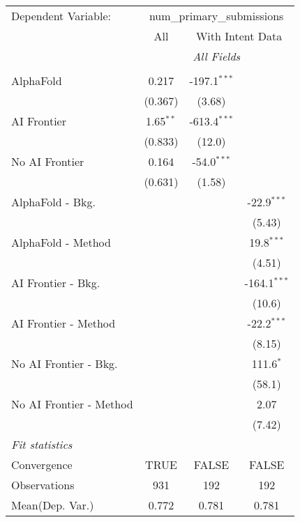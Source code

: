 \begingroup
\centering
\begin{tabular}{lccc}
   \tabularnewline \midrule \midrule
   Dependent Variable: & \multicolumn{3}{c}{num\_primary\_submissions}\\
 & \multicolumn{1}{c}{All} & \multicolumn{2}{c}{With Intent Data} \\
\cmidrule(lr){2-2} \cmidrule(lr){3-4}
 & \multicolumn{3}{c}{\textit{All Fields}} \\ \\
   AlphaFold               & 0.217       & -197.1$^{***}$ &   \\   
                           & (0.367)     & (3.68)         &   \\   
   AI Frontier             & 1.65$^{**}$ & -613.4$^{***}$ &   \\   
                           & (0.833)     & (12.0)         &   \\   
   No AI Frontier          & 0.164       & -54.0$^{***}$  &   \\   
                           & (0.631)     & (1.58)         &   \\   
   AlphaFold - Bkg.        &             &                & -22.9$^{***}$\\   
                           &             &                & (5.43)\\   
   AlphaFold - Method      &             &                & 19.8$^{***}$\\   
                           &             &                & (4.51)\\   
   AI Frontier - Bkg.      &             &                & -164.1$^{***}$\\   
                           &             &                & (10.6)\\   
   AI Frontier - Method    &             &                & -22.2$^{***}$\\   
                           &             &                & (8.15)\\   
   No AI Frontier - Bkg.   &             &                & 111.6$^{*}$\\   
                           &             &                & (58.1)\\   
   No AI Frontier - Method &             &                & 2.07\\   
                           &             &                & (7.42)\\   
   \midrule
   \emph{Fit statistics}\\
   Convergence             &TRUE         & FALSE          & FALSE\\  
   Observations            & 931         & 192            & 192\\  
Mean(Dep. Var.) & 0.772 & 0.781 & 0.781 \\
   

\end{tabular}
